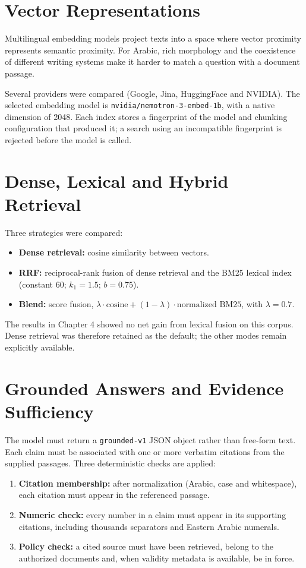 \documentclass[a4paper,12pt,openany]{report}
\begin{document}
\section{Vector Representations}
Multilingual embedding models project texts into a space where vector proximity represents semantic
proximity. For Arabic, rich morphology and the coexistence of different writing systems make it
harder to match a question with a document passage.

Several providers were compared (Google, Jina, HuggingFace and NVIDIA). The selected embedding
model is \texttt{nvidia/nemotron-3-embed-1b}, with a native dimension of 2048. Each index stores a
fingerprint of the model and chunking configuration that produced it; a search using an
incompatible fingerprint is rejected before the model is called.

\section{Dense, Lexical and Hybrid Retrieval}
Three strategies were compared:
\begin{itemize}
  \item \textbf{Dense retrieval:} cosine similarity between vectors.
  \item \textbf{RRF:} reciprocal-rank fusion of dense retrieval and the BM25 lexical index
(constant 60; $k_1=1.5$; $b=0.75$).
  \item \textbf{Blend:} score fusion, $\lambda \cdot \text{cosine} + (1-\lambda)\cdot
\text{normalized BM25}$, with $\lambda=0.7$.
\end{itemize}
The results in Chapter 4 showed no net gain from lexical fusion on this corpus. Dense retrieval
was therefore retained as the default; the other modes remain explicitly available.

\section{Grounded Answers and Evidence Sufficiency}
The model must return a \texttt{grounded-v1} JSON object rather than free-form text. Each claim must
be associated with one or more verbatim citations from the supplied passages. Three deterministic
checks are applied:
\begin{enumerate}
  \item \textbf{Citation membership:} after normalization (Arabic, case and whitespace), each
citation must appear in the referenced passage.
  \item \textbf{Numeric check:} every number in a claim must appear in its supporting citations,
including thousands separators and Eastern Arabic numerals.
  \item \textbf{Policy check:} a cited source must have been retrieved, belong to the authorized
documents and, when validity metadata is available, be in force.
\end{enumerate}
\end{document}
